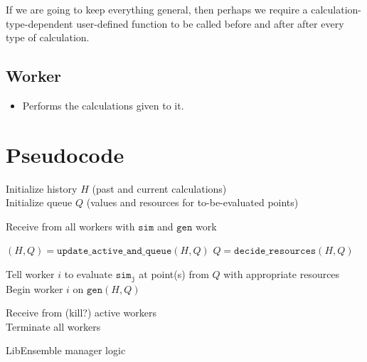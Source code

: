 \documentclass{article}
\begin{document}
If we are going to keep everything general, then perhaps we require a
calculation-type-dependent user-defined function to be called before and after
after every type of calculation.

\subsection{Worker}
\begin{itemize}
  \item Performs the calculations given to it.
\end{itemize}


\section{Pseudocode}

\newpage
\LinesNumbered
\begin{algorithm}[t] %
  Initialize history $H$ (past and current calculations)\\
  Initialize queue $Q$ (values and resources for to-be-evaluated points) 

  
  {
    {
      Receive from all workers with $\mathtt{sim}$ and $\mathtt{gen}$ work\\
    }

    $(H,Q) = \mathtt{update\_active\_and\_queue}(H,Q)$
    $Q = \mathtt{decide\_resources}(H,Q)$

    {
      {
      Tell worker $i$ to evaluate $\mathtt{sim_j}$ at point(s) from $Q$ with appropriate resources
      }{
      Begin worker $i$ on $\mathtt{gen}(H,Q)$\\
      }
    }
  }
  Receive from (kill?) active workers\\ 
  Terminate all workers
  \caption{LibEnsemble manager logic \label{alg:manager}} 
\end{algorithm}
\end{document}

